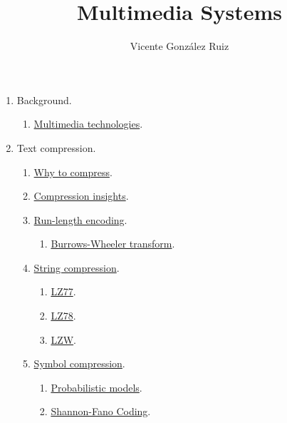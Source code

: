 
\title{Multimedia Systems}
\author{Vicente González Ruiz}

\maketitle

\begin{enumerate}
\item Background.
  \begin{enumerate}
  \item \href{https://tecnologias-multimedia.github.io}{Multimedia technologies}.
  \end{enumerate}
  
\item Text compression.
  \begin{enumerate}
  \item \href{https://vicente-gonzalez-ruiz.github.io/why_to_compress/}{Why to compress}.
  \item \href{https://vicente-gonzalez-ruiz.github.io/compression_insights/}{Compression insights}.
  \item \href{https://vicente-gonzalez-ruiz.github.io/run-length_encoding/}{Run-length encoding}.
  \begin{enumerate}
  \item \href{https://vicente-gonzalez-ruiz.github.io/Burrows-Wheeler_transform/}{Burrows-Wheeler transform}.
  \end{enumerate}
\item \href{https://vicente-gonzalez-ruiz.github.io/string_compression/}{String compression}.
  \begin{enumerate}
  \item \href{https://vicente-gonzalez-ruiz.github.io/LZ77/}{LZ77}.
  \item \href{https://vicente-gonzalez-ruiz.github.io/LZ78/}{LZ78}.
  \item \href{https://vicente-gonzalez-ruiz.github.io/LZW/}{LZW}.
  \end{enumerate}
\item \href{https://vicente-gonzalez-ruiz.github.io/symbol_compression/}{Symbol compression}.
  \begin{enumerate}
  \item \href{https://vicente-gonzalez-ruiz.github.io/probabilistic_models/}{Probabilistic models}.
  \item \href{https://vicente-gonzalez-ruiz.github.io/Shannon-Fano_coding/}{Shannon-Fano Coding}.

\end{enumerate}
\end{enumerate}
\end{enumerate}
